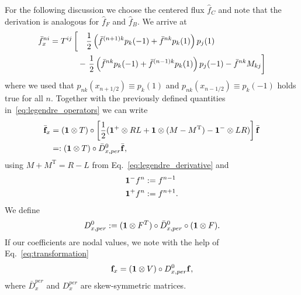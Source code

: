 For the following discussion we choose the centered flux $\hat f_C$ and note
that the derivation is analogous for $\hat f_F$ and $\hat f_B$.
We arrive at
\begin{align}
    \bar f_x^{ni}= T^{ij}&\left[ \quad \frac{1}{2} \left(\bar f^{(n+1)k}p_k(-1)+ \bar f^{nk}p_k(1)\right)p_j(1)\right. \nonumber\\
        &\ \ - \left.\frac{1}{2} \left(\bar f^{nk}p_k(-1) + \bar f^{(n-1)k}p_k(1)\right)p_j(-1) - \bar f^{nk} M_{kj} \vphantom{\frac{1}{2}}\right]
    \label{}
\end{align}
where we used that $p_{nk}(x_{n+1/2})\equiv p_k(1)$ and $p_{nk}(x_{n-1/2}) \equiv p_k(-1)$ holds true for all $n$.
Together with the previously defined quantities in~\eqref{eq:legendre_operators} we can write
\begin{align}
	\bar{\mathbf f}_x  &= (\mathbf{1}\otimes T)\circ \left[ \frac{1}{2}(\mathbf{1}^+\otimes RL + \mathbf{1} \otimes (M-M^{\mathrm{T}}) - \mathbf{1}^-\otimes LR)\right] \bar{\mathbf f}\nonumber \\
    &=: (\mathbf{1}\otimes T) \circ \bar D^0_{x,per} \bar {\mathbf f},
    \label{eq:discrete_der}
\end{align}
using $M+M^{\mathrm{T}} = R-L$ from Eq.~\eqref{eq:legendre_derivative}
and 
\begin{align}
    \mathbf{1}^{-}f^{n} &:= f^{n-1}\\
    \mathbf{1}^{+}f^{n} &:= f^{n+1}.
    \label{eq:operator_one}
\end{align}
We define
\begin{align*}
    D^0_{x,per} := (\mathbf{1}\otimes F^T)\circ \bar D^0_{x,per}\circ (\mathbf{1}\otimes F).
    \label{}
\end{align*}
If our coefficients are nodal values, we note with the help of Eq.~\eqref{eq:transformation}
\begin{align}
	\mathbf f_x %
 = (\Eins\otimes V)\circ D^0_{x,per} \mathbf f,
    \label{eq:matrix_xspace}
\end{align}
where $\bar D_x^{per}$ and $D_x^{per}$ are skew-symmetric matrices.

